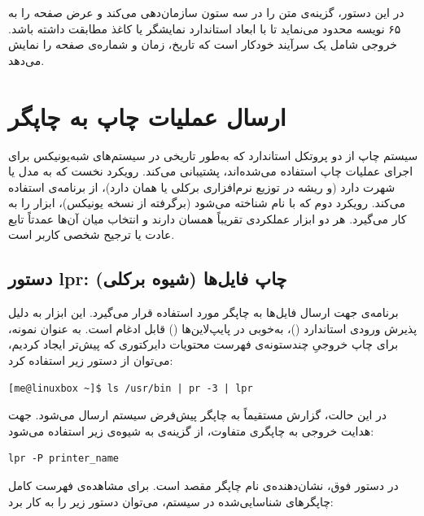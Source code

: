 در این دستور، گزینه‌ی  متن را در سه ستون سازمان‌دهی می‌کند و  عرض صفحه را به ۶۵ نویسه محدود می‌نماید تا با ابعاد استاندارد نمایشگر یا کاغذ مطابقت داشته باشد. خروجی شامل یک سرآیند خودکار است که تاریخ، زمان و شماره‌ی صفحه را نمایش می‌دهد.

\section{ارسال عملیات چاپ به چاپگر}

سیستم چاپ  از دو پروتکل استاندارد که به‌طور تاریخی در سیستم‌های شبه‌یونیکس برای اجرای عملیات چاپ استفاده می‌شده‌اند، پشتیبانی می‌کند. رویکرد نخست که به مدل  یا  شهرت دارد (و ریشه در توزیع نرم‌افزاری برکلی یا همان  دارد)، از برنامه‌ی  استفاده می‌کند. رویکرد دوم که با نام  شناخته می‌شود (برگرفته از نسخه  یونیکس)، ابزار  را به کار می‌گیرد. هر دو ابزار عملکردی تقریباً همسان دارند و انتخاب میان آن‌ها عمدتاً تابع عادت یا ترجیح شخصی کاربر است.

\subsection{دستور lpr: چاپ فایل‌ها (شیوه برکلی)}

برنامه‌ی  جهت ارسال فایل‌ها به چاپگر مورد استفاده قرار می‌گیرد. این ابزار به دلیل پذیرش ورودی استاندارد ()، به‌خوبی در پایپ‌لاین‌ها () قابل ادغام است. به عنوان نمونه، برای چاپ خروجیِ چندستونه‌ی فهرست محتویات دایرکتوری که پیش‌تر ایجاد کردیم، می‌توان از دستور زیر استفاده کرد:

\begin{latin}
\begin{lstlisting}
[me@linuxbox ~]$ ls /usr/bin | pr -3 | lpr
\end{lstlisting}
\end{latin}

در این حالت، گزارش مستقیماً به چاپگر پیش‌فرض سیستم ارسال می‌شود. جهت هدایت خروجی به چاپگری متفاوت، از گزینه‌ی  به شیوه‌ی زیر استفاده می‌شود:

\begin{latin}
\begin{lstlisting}
lpr -P printer_name
\end{lstlisting}
\end{latin}

در دستور فوق،  نشان‌دهنده‌ی نام چاپگر مقصد است. برای مشاهده‌ی فهرست کامل چاپگرهای شناسایی‌شده در سیستم، می‌توان دستور زیر را به کار برد:

